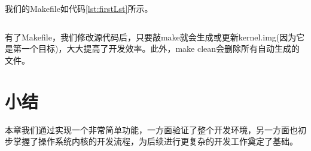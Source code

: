 \documentclass[main.tex]{subfiles}
\begin{document}
\begin{CJK*}{UTF8}{song}
\par
我们的Makefile如代码\ref{lst:firstLst}所示。
\begin{code}
\label{lst:firstLst}
\inputminted[linenos,numbersep=5pt,frame=lines,framesep=2mm]{make}{src/chapter02/kernel/Makefile}
\end{code}
有了Makefile，我们修改源代码后，只要敲make就会生成或更新kernel.img(因为它是第一个目标)，大大提高了开发效率。此外，make clean会删除所有自动生成的文件。

\section{小结}
本章我们通过实现一个非常简单功能，一方面验证了整个开发环境，另一方面也初步掌握了操作系统内核的开发流程，为后续进行更复杂的开发工作奠定了基础。

\clearpage
\ifxetex\else
\end{CJK*}
\fi
\end{document}

